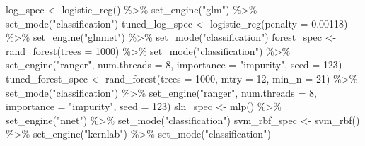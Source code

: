 \documentclass[
]{article}
\newenvironment{Shaded}{\begin{snugshade}}{\end{snugshade}}
\newcommand{\AttributeTok}[1]{\textcolor[rgb]{0.77,0.63,0.00}{#1}}
\newcommand{\DecValTok}[1]{\textcolor[rgb]{0.00,0.00,0.81}{#1}}
\newcommand{\FloatTok}[1]{\textcolor[rgb]{0.00,0.00,0.81}{#1}}
\newcommand{\FunctionTok}[1]{\textcolor[rgb]{0.00,0.00,0.00}{#1}}
\newcommand{\NormalTok}[1]{#1}
\newcommand{\OtherTok}[1]{\textcolor[rgb]{0.56,0.35,0.01}{#1}}
\newcommand{\SpecialCharTok}[1]{\textcolor[rgb]{0.00,0.00,0.00}{#1}}
\newcommand{\StringTok}[1]{\textcolor[rgb]{0.31,0.60,0.02}{#1}}
\begin{document}
\begin{Shaded}
\begin{Highlighting}[]
\NormalTok{log\_spec }\OtherTok{\textless{}{-}}
  \FunctionTok{logistic\_reg}\NormalTok{() }\SpecialCharTok{\%\textgreater{}\%}
  \FunctionTok{set\_engine}\NormalTok{(}\StringTok{"glm"}\NormalTok{) }\SpecialCharTok{\%\textgreater{}\%}
  \FunctionTok{set\_mode}\NormalTok{(}\StringTok{"classification"}\NormalTok{)}
\NormalTok{tuned\_log\_spec }\OtherTok{\textless{}{-}}
  \FunctionTok{logistic\_reg}\NormalTok{(}\AttributeTok{penalty =} \FloatTok{0.00118}\NormalTok{) }\SpecialCharTok{\%\textgreater{}\%}
  \FunctionTok{set\_engine}\NormalTok{(}\StringTok{"glmnet"}\NormalTok{) }\SpecialCharTok{\%\textgreater{}\%}
  \FunctionTok{set\_mode}\NormalTok{(}\StringTok{"classification"}\NormalTok{)}
\NormalTok{forest\_spec }\OtherTok{\textless{}{-}}
  \FunctionTok{rand\_forest}\NormalTok{(}\AttributeTok{trees =} \DecValTok{1000}\NormalTok{) }\SpecialCharTok{\%\textgreater{}\%}
  \FunctionTok{set\_mode}\NormalTok{(}\StringTok{"classification"}\NormalTok{) }\SpecialCharTok{\%\textgreater{}\%}
  \FunctionTok{set\_engine}\NormalTok{(}\StringTok{"ranger"}\NormalTok{, }\AttributeTok{num.threads =} \DecValTok{8}\NormalTok{, }\AttributeTok{importance =} \StringTok{"impurity"}\NormalTok{, }\AttributeTok{seed =} \DecValTok{123}\NormalTok{)}
\NormalTok{tuned\_forest\_spec }\OtherTok{\textless{}{-}}
  \FunctionTok{rand\_forest}\NormalTok{(}\AttributeTok{trees =} \DecValTok{1000}\NormalTok{, }\AttributeTok{mtry =} \DecValTok{12}\NormalTok{, }\AttributeTok{min\_n =} \DecValTok{21}\NormalTok{) }\SpecialCharTok{\%\textgreater{}\%}
  \FunctionTok{set\_mode}\NormalTok{(}\StringTok{"classification"}\NormalTok{) }\SpecialCharTok{\%\textgreater{}\%}
  \FunctionTok{set\_engine}\NormalTok{(}\StringTok{"ranger"}\NormalTok{, }\AttributeTok{num.threads =} \DecValTok{8}\NormalTok{, }\AttributeTok{importance =} \StringTok{"impurity"}\NormalTok{, }\AttributeTok{seed =} \DecValTok{123}\NormalTok{)}
\NormalTok{sln\_spec }\OtherTok{\textless{}{-}}
  \FunctionTok{mlp}\NormalTok{() }\SpecialCharTok{\%\textgreater{}\%}
  \FunctionTok{set\_engine}\NormalTok{(}\StringTok{"nnet"}\NormalTok{) }\SpecialCharTok{\%\textgreater{}\%}
  \FunctionTok{set\_mode}\NormalTok{(}\StringTok{"classification"}\NormalTok{)}
\NormalTok{svm\_rbf\_spec }\OtherTok{\textless{}{-}}
  \FunctionTok{svm\_rbf}\NormalTok{() }\SpecialCharTok{\%\textgreater{}\%}
  \FunctionTok{set\_engine}\NormalTok{(}\StringTok{"kernlab"}\NormalTok{) }\SpecialCharTok{\%\textgreater{}\%}
  \FunctionTok{set\_mode}\NormalTok{(}\StringTok{"classification"}\NormalTok{)}

\end{Highlighting}
\end{Shaded}
\end{document}
